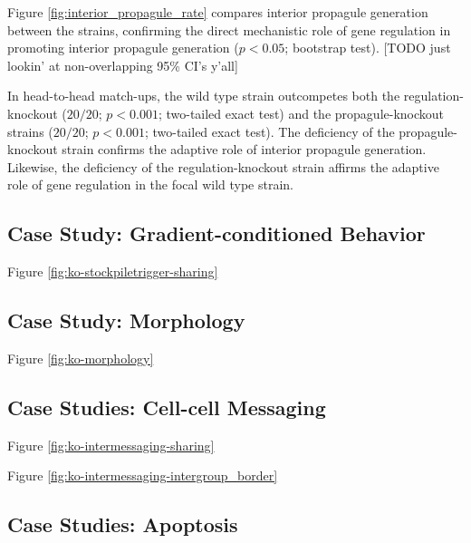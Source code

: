 Figure \ref{fig:interior_propagule_rate} compares interior propagule generation between the strains, confirming the direct mechanistic role of gene regulation in promoting interior propagule generation ($p < 0.05$; bootstrap test).
[TODO just lookin' at non-overlapping 95\% CI's y'all]

In head-to-head match-ups, the wild type strain outcompetes both the regulation-knockout ($20/20$; $p < 0.001$; two-tailed exact test) and the propagule-knockout strains
($20/20$; $p < 0.001$; two-tailed exact test).
The deficiency of the propagule-knockout strain confirms the adaptive role of interior propagule generation.
Likewise, the deficiency of the regulation-knockout strain affirms the adaptive role of gene regulation in the focal wild type strain.

\subsection{Case Study: Gradient-conditioned Behavior} \label{sec:gradient-conditioned-behavior}



Figure \ref{fig:ko-stockpiletrigger-sharing}

\subsection{Case Study: Morphology} \label{sec:morphology}



Figure \ref{fig:ko-morphology}

\subsection{Case Studies: Cell-cell Messaging} \label{sec:cell-cell-messaging}





Figure \ref{fig:ko-intermessaging-sharing}

Figure \ref{fig:ko-intermessaging-intergroup_border}

\subsection{Case Studies: Apoptosis} \label{sec:apoptosis}



